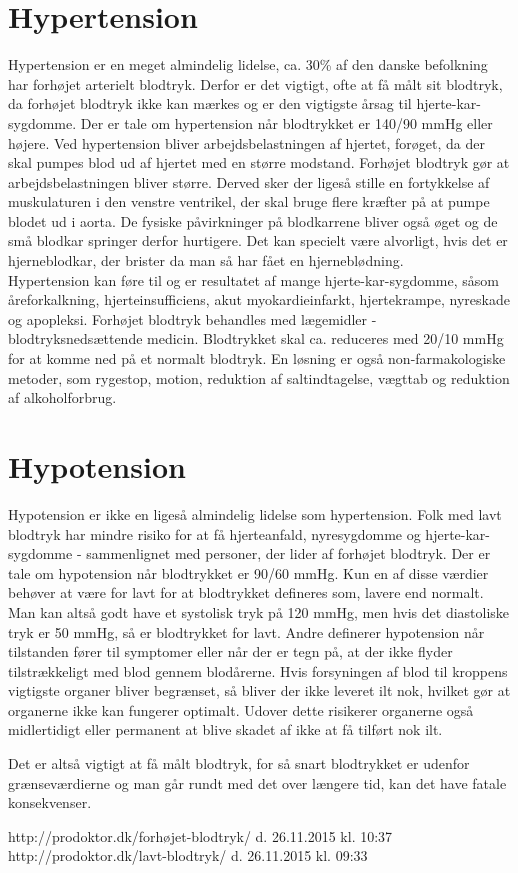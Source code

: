 \section{Hypertension} 
Hypertension er en meget almindelig lidelse, ca. 30\% af den danske befolkning har forhøjet arterielt blodtryk. Derfor er det vigtigt, ofte at få målt sit blodtryk, da forhøjet blodtryk ikke kan mærkes og er den vigtigste årsag til hjerte-kar-sygdomme. 
Der er tale om hypertension når blodtrykket er 140/90 mmHg eller højere.
Ved hypertension bliver arbejdsbelastningen af hjertet, forøget, da der skal pumpes blod ud af hjertet med en større modstand.
Forhøjet blodtryk gør at arbejdsbelastningen bliver større. Derved sker der ligeså stille en fortykkelse af muskulaturen i den venstre ventrikel, der skal bruge flere kræfter på at pumpe blodet ud i aorta. 
De fysiske påvirkninger på blodkarrene bliver også øget og de små blodkar springer derfor hurtigere. Det kan specielt være alvorligt, hvis det er hjerneblodkar, der brister da man så har fået en hjerneblødning. \\
Hypertension kan føre til og er resultatet af mange hjerte-kar-sygdomme, såsom åreforkalkning, hjerteinsufficiens, akut myokardieinfarkt, hjertekrampe, nyreskade og apopleksi.
Forhøjet blodtryk behandles med lægemidler - blodtryksnedsættende medicin. Blodtrykket skal ca. reduceres med 20/10 mmHg for at komme ned på et normalt blodtryk. En løsning er også non-farmakologiske metoder, som rygestop, motion, reduktion af saltindtagelse, vægttab og reduktion af alkoholforbrug. 

\section{Hypotension} 
Hypotension er ikke en ligeså almindelig lidelse som hypertension. Folk med lavt blodtryk har mindre risiko for at få hjerteanfald, nyresygdomme og hjerte-kar-sygdomme - sammenlignet med personer, der lider af forhøjet blodtryk.
Der er tale om hypotension når blodtrykket er 90/60 mmHg. Kun en af disse værdier behøver at være for lavt for at blodtrykket defineres som, lavere end normalt. Man kan altså godt have et systolisk tryk på 120 mmHg, men hvis det diastoliske tryk er 50 mmHg, så er blodtrykket for lavt.  
Andre definerer hypotension når tilstanden fører til symptomer eller når der er tegn på, at der ikke flyder tilstrækkeligt med blod gennem blodårerne. Hvis forsyningen af blod til kroppens vigtigste organer bliver begrænset, så bliver der ikke leveret ilt nok, hvilket gør at organerne ikke kan fungerer optimalt. Udover dette risikerer organerne også midlertidigt eller permanent at blive skadet af ikke at få tilført nok ilt. 

Det er altså vigtigt at få målt blodtryk, for så snart blodtrykket er udenfor grænseværdierne og man går rundt med det over længere tid, kan det have fatale konsekvenser.   


http://prodoktor.dk/forhøjet-blodtryk/  d. 26.11.2015 kl. 10:37
http://prodoktor.dk/lavt-blodtryk/  d. 26.11.2015 kl. 09:33


